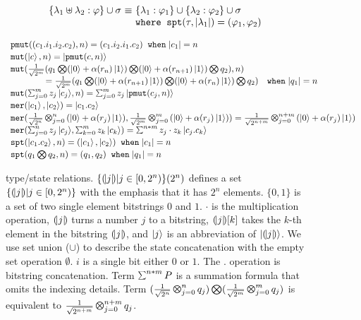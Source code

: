 \begin{figure}
{{\begin{minipage}[t]{0.475\textwidth}
\begin{center}
\[\begin{array}{l@{~}c@{~}l}
   \\[0.2em]
  \{\lambda_1 \uplus \lambda_2 :\varphi\} \cup \sigma &\equiv& \{\lambda_1 :\varphi_1\} \cup \{\lambda_2 :\varphi_2\} \cup \sigma
\\
&&\texttt{where}\;\;\texttt{spt}(\tau,\slen{\lambda_1})=(\varphi_1,\varphi_2)
    \end{array}
 \]
\end{center}
  \label{fig:qafny-stateequiv}
\end{minipage}
{\footnotesize
\[
\begin{array}{l}
\texttt{pmut}((c_1.i_1.i_2.c_2),n)=(c_1.i_2.i_1.c_2) \;\;\texttt{when}\;\slen{c_1}=n
\\[0.2em]
\texttt{mut}(\ket{c},n)=\ket{\texttt{pmut}(c,n)}
\\[0.2em]
\texttt{mut}(\frac{1}{\sqrt{2^m}}(q_1 \bigotimes (\ket{0}+\alpha(r_n)\ket{1}) \bigotimes (\ket{0}+\alpha(r_{n+1})\ket{1}) \bigotimes q_2),n)
\\
\qquad\qquad
=\frac{1}{\sqrt{2^m}}(q_1 \bigotimes (\ket{0}+\alpha(r_{n+1})\ket{1}) \bigotimes (\ket{0}+\alpha(r_n)\ket{1}) \bigotimes q_2)
\quad\texttt{when\;}\slen{q_1}=n
\\[0.2em]
\texttt{mut}(\sch{m}{z_j}{c_j},n)=\sch{m}{z_j}{\texttt{pmut}(c_j,n)}
\\[0.2em]
\texttt{mer}(\ket{c_1},\ket{c_2})=\ket{c_1.c_2}
\\[0.2em]
\texttt{mer}(\shad{2^n}{n}{\alpha(r_j)},\shad{2^m}{m}{\alpha(r_j)})=\shad{2^{n+m}}{n+m}{\alpha(r_j)}
\\[0.2em]
\texttt{mer}(\sch{n}{z_j}{c_j},\schk{m}{z_k}{c_k})=\schi{n*m}{z_j\cdot z_k}{c_j.c_k}
\\[0.2em]
\texttt{spt}(\ket{c_1.c_2},n)=(\ket{c_1},\ket{c_2}) \;\;\texttt{when}\;\slen{c_1}=n
\\[0.2em]
\texttt{spt}(q_1\bigotimes q_2,n)=(q_1,q_2) \;\;\texttt{when}\;\slen{q_1}=n
\end{array}
\]
}
  \caption{\qafny type/state relations. $\{(\!| j |\!)|j\in[0,2^n)\}(2^n)$ defines a set $\{(\!| j |\!)|j\in[0,2^n)\}$ with the emphasis that it has $2^n$ elements. $\{0,1\}$ is a set of two single element bitstrings $0$ and $1$. $\cdot$ is the multiplication operation, $(\!| j |\!)$ turns a number $j$ to a bitstring, $(\!| j |\!)[k]$ takes the $k$-th element in the bitstring $(\!| j |\!)$, and $\left\vert{j}\right\rangle$ is an abbreviation of $\left\vert{(\!| j |\!)}\right\rangle$. We use set union ($\cup$) to describe the state concatenation with the empty set operation $\emptyset$. $i$ is a single bit either $0$ or $1$. The $.$ operation is bitstring concatenation. Term $\Msum^{n*m}P$ is a summation formula that omits the indexing details.
Term $(\frac{1}{\sqrt{2^{n}}}\Motimes_{j=0}^{n}q_j) \bigotimes(\frac{1}{\sqrt{2^{m}}}\Motimes_{j=0}^{m}q_j)$ is equivalent to $\frac{1}{\sqrt{2^{n+m}}}\Motimes_{j=0}^{n+m}q_j$.}
  \label{fig:qafny-eq}
}
}
\end{figure}

